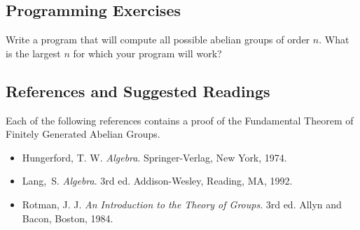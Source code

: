 \subsection*{Programming Exercises}
 
{\small
Write a program that will compute all possible abelian
groups of order $n$.  What is the largest $n$ for which your
program will work?
}
 
 
 
\subsection*{References and Suggested Readings}
 
 
 
{\small
Each of the following references contains a proof of the Fundamental
Theorem of Finitely Generated Abelian Groups.
\begin{itemize}
 
\item[{\bf [1]}]   %
Hungerford, T. W. {\it Algebra}. Springer-Verlag, New York, 1974.
 
\item[{\bf [2]}]
Lang,~S. {\it Algebra}. 3rd ed. Addison-Wesley, Reading, MA, 1992.
 
\item[{\bf [3]}]
Rotman, J. J. {\it An Introduction to the Theory of
Groups}. 3rd ed. Allyn and Bacon, Boston, 1984.
 
 
\end{itemize}
}
 
 
 
 
 
